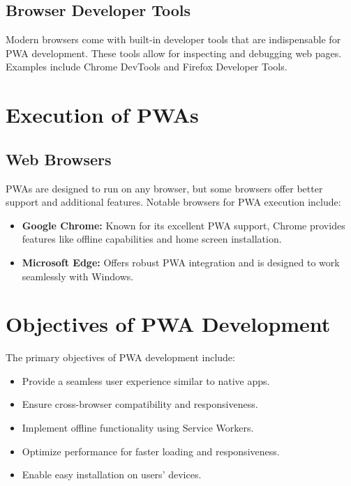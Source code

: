 \documentclass[]{article}
\begin{document}
	\subsection{Browser Developer Tools}
	Modern browsers come with built-in developer tools that are indispensable for PWA development. These tools allow for inspecting and debugging web pages. Examples include Chrome DevTools and Firefox Developer Tools.
	
	\section{Execution of PWAs}
	
	\subsection{Web Browsers}
	PWAs are designed to run on any browser, but some browsers offer better support and additional features. Notable browsers for PWA execution include:
	
	\begin{itemize}
		\item \textbf{Google Chrome:} Known for its excellent PWA support, Chrome provides features like offline capabilities and home screen installation.
		
		\item \textbf{Microsoft Edge:} Offers robust PWA integration and is designed to work seamlessly with Windows.
	\end{itemize}
	
	\section{Objectives of PWA Development}
	The primary objectives of PWA development include:
	
	\begin{itemize}
		\item Provide a seamless user experience similar to native apps.
		
		\item Ensure cross-browser compatibility and responsiveness.
		
		\item Implement offline functionality using Service Workers.
		
		\item Optimize performance for faster loading and responsiveness.
		
		\item Enable easy installation on users' devices.
	\end{itemize}
	
\end{document}
